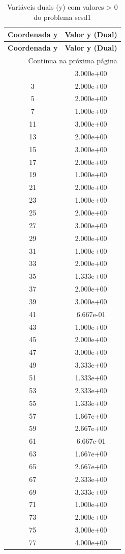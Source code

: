 \documentclass[12pt]{article}
\begin{document}
\begin{longtable}{@{}cc@{}}
\caption{Variáveis duais (y) com valores > 0 do problema scsd1} \\
\toprule
\textbf{Coordenada y} & \textbf{Valor y (Dual)} \\
\midrule
\endfirsthead

\toprule
\textbf{Coordenada y} & \textbf{Valor y (Dual)} \\
\midrule
\endhead

\midrule \multicolumn{2}{r}{{Continua na próxima página}} \\ \midrule
\endfoot

\bottomrule
\endlastfoot
1 & 3.000e+00 \\
3 & 2.000e+00 \\
5 & 2.000e+00 \\
7 & 1.000e+00 \\
11 & 3.000e+00 \\
13 & 2.000e+00 \\
15 & 3.000e+00 \\
17 & 2.000e+00 \\
19 & 1.000e+00 \\
21 & 2.000e+00 \\
23 & 1.000e+00 \\
25 & 2.000e+00 \\
27 & 3.000e+00 \\
29 & 2.000e+00 \\
31 & 1.000e+00 \\
33 & 2.000e+00 \\
35 & 1.333e+00 \\
37 & 2.000e+00 \\
39 & 3.000e+00 \\
41 & 6.667e-01 \\
43 & 1.000e+00 \\
45 & 2.000e+00 \\
47 & 3.000e+00 \\
49 & 3.333e+00 \\
51 & 1.333e+00 \\
53 & 2.333e+00 \\
55 & 1.333e+00 \\
57 & 1.667e+00 \\
59 & 2.667e+00 \\
61 & 6.667e-01 \\
63 & 1.667e+00 \\
65 & 2.667e+00 \\
67 & 2.333e+00 \\
69 & 3.333e+00 \\
71 & 1.000e+00 \\
73 & 2.000e+00 \\
75 & 3.000e+00 \\
77 & 4.000e+00 \\

\bottomrule
\end{longtable}
\end{document}
